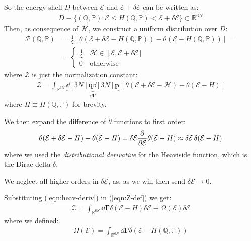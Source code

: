 \documentclass[../../main.tex]{subfiles}
\begin{document}
So the energy shell $D$ between $\mathcal{E}$ and $\mathcal{E}+ \delta \mathcal{E}$ can be written as:
\begin{align*}
    D \equiv \{(\mathbb{Q},\mathbb{P}) \colon \mathcal{E} \leq H(\mathbb{Q}, \mathbb{P}) < \mathcal{E}+ \delta \mathcal{E}\} \subset \mathbb{R}^{6N}
\end{align*}
Then, as consequence of $\mathcal{H}$, we construct a uniform distribution over $D$:
\begin{align}\label{eqn:pQP}
    \mathcal{P}(\mathbb{Q},\mathbb{P}) &= \frac{1}{\mathcal{Z}} [\theta(\mathcal{E}+ \delta \mathcal{E} - H(\mathbb{Q},\mathbb{P})) - \theta(\mathcal{E}-H(\mathbb{Q},\mathbb{P}))] =\\
    &= \begin{cases} 
        \frac{1}{\mathcal{Z}} & \mathcal{H}\in [\mathcal{E}, \mathcal{E}+\delta \mathcal{E}]\\
        0 & \text{otherwise} 
    \end{cases} \nonumber
\end{align}
where $\mathcal{Z}$ is just the normalization constant:
\begin{align}\label{eqn:Z-def}
    \mathcal{Z} = \int_{\mathbb{R}^{6N}} \underbrace{\dd[3N]{\bm{q}}\dd[3N]{\bm{p}}}_{\dd{\bm{\Gamma}}}\> [\theta(\mathcal{E}+\delta \mathcal{E-H}) - \theta(\mathcal{E}-H)]
\end{align}
where $H\equiv H(\mathbb{Q},\mathbb{P})$ for brevity.

\medskip

We then expand the difference of $\theta$ functions to first order:
\begin{align} \label{eqn:heav-deriv}
    \theta(\mathcal{E}+\delta \mathcal{E}-H) - \theta(\mathcal{E}-H) = \delta \mathcal{E} \pdv{\mathcal{E}} \theta(\mathcal{E}-H) \approx \delta \mathcal{E}\, \delta(\mathcal{E}-H)
\end{align} 
where we used the \textit{distributional derivative} for the Heaviside function, which is the Dirac delta $\delta$. %

We neglect all higher orders in $\delta\mathcal{E}$, as, as we will then send $\delta \mathcal{E} \to 0$.

\medskip

Substituting (\ref{eqn:heav-deriv}) in (\ref{eqn:Z-def}) we get:
\begin{align}\label{eqn:z-omega}
    \mathcal{Z}= \int_{\mathbb{R}^{6N}} \dd{\bm{\Gamma}} \delta(\mathcal{E}-H)\delta \mathcal{E} \equiv \Omega(\mathcal{E}) \delta \mathcal{E}
\end{align}
where we defined:
\begin{align}\label{eqn:omega-def}
    \Omega(\mathcal{E}) = \int_{\mathbb{R}^{6N}} \dd{\bm{\Gamma}} \delta(\mathcal{E}-H(\mathbb{Q},\mathbb{P}))
\end{align}
\end{document}
